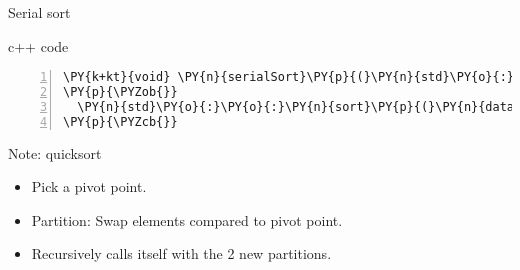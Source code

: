 \documentclass{beamer}
\begin{document}
\begin{frame}[fragile]{Serial sort}

\begin{block}{c++ code}

\tiny
\begin{Verbatim}[commandchars=\\\{\},numbers=left,firstnumber=1,stepnumber=1]
\PY{k+kt}{void} \PY{n}{serialSort}\PY{p}{(}\PY{n}{std}\PY{o}{:}\PY{o}{:}\PY{n}{vector}\PY{o}{<}\PY{k+kt}{float}\PY{o}{>}\PY{o}{&} \PY{n}{data}\PY{p}{)}
\PY{p}{\PYZob{}}
  \PY{n}{std}\PY{o}{:}\PY{o}{:}\PY{n}{sort}\PY{p}{(}\PY{n}{data}\PY{p}{.}\PY{n}{begin}\PY{p}{(}\PY{p}{)}\PY{p}{,} \PY{n}{data}\PY{p}{.}\PY{n}{end}\PY{p}{(}\PY{p}{)}\PY{p}{)}\PY{p}{;}
\PY{p}{\PYZcb{}}
\end{Verbatim}

\end{block}

\begin{exampleblock}{Note: quicksort}
  \small
  \begin{itemize}
    \item Pick a pivot point.
    \item Partition: Swap elements compared to pivot point.
    \item Recursively calls itself with the 2 new partitions.
  \end{itemize}
\end{exampleblock}

\end{frame}

\end{document}
